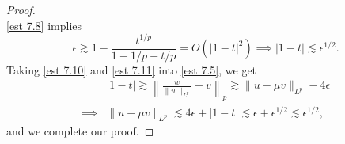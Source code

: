 \documentclass[10pt,a4paper]{amsart}
\begin{document}
\begin{proof}
\begin{equation*}
    \end{equation*}
    \eqref{est 7.8} implies
    \begin{equation}\label{est 7.11}
        \epsilon \gtrsim 1-\frac{t^{1/p}}{1-1/p + t/p} = O(|1-t|^2) \implies |1-t|\lesssim \epsilon^{1/2}.
    \end{equation}
    Taking \eqref{est 7.10} and \eqref{est 7.11} into \eqref{est 7.5}, we get
    \begin{equation*}
        \begin{split}
            & |1-t| \gtrsim \left\|\frac{w}{\|w\|_{L^p}}-v\right\|_p \gtrsim \|u-\mu v\|_{L^p}-4\epsilon \\
            \implies{}& \|u-\mu v\|_{L^p} \lesssim 4\epsilon + |1-t| \lesssim \epsilon + \epsilon^{1/2} \lesssim \epsilon^{1/2},
        \end{split}
    \end{equation*}
    and we complete our proof.
\end{proof}
\end{document}
